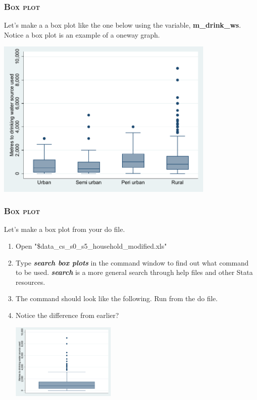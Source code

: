 \documentclass[10pt]{beamer}
\begin{document}
	\begin{frame}
	\frametitle{\textsc{Box plot}}
		Let's make a a box plot like the one below using the variable, \textbf{m\_drink\_ws}.
		Notice a box plot is an example of a oneway graph. 
\begin{center}
    \includegraphics[width=0.8\textwidth]{boxplot_1.pdf}
\end{center}
	\end{frame}
	
	\begin{frame}
	\frametitle{\textsc{Box plot}}	
		 Let's make a box plot from your do file.
		\begin{enumerate}
			 \item Open "\$data\_cs\_s0\_s5\_household\_modified.xls"
			 \item Type \textbf{\textit{search box plots}} in the command window to find out what command to be used.
					\textbf{\textit{search}} is a more general search through help files and other Stata resources.
			 \onslide<2-> \item The command should look like the following. Run from the do file.
		
\begin{stlog}\end{stlog}
			\vspace{1mm}
			 \item Notice the difference from earlier? 
			\vspace{1mm}			
		
\begin{center}
    \includegraphics[width=0.4\textwidth]{boxplot_2.pdf}
\end{center}
		\end{enumerate}
	\end{frame}
\end{document}
